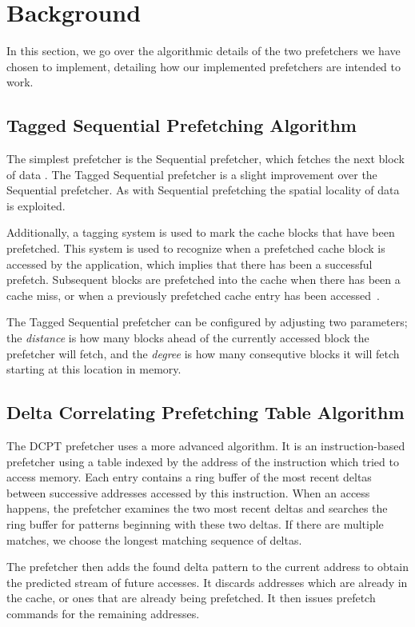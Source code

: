 \section{Background}

In this section, we go over the algorithmic details of the two prefetchers we
have chosen to implement, detailing how our implemented prefetchers are intended
to work.

\subsection{Tagged Sequential Prefetching Algorithm}

The simplest prefetcher is the Sequential prefetcher, which fetches the next
block of data \cite{seq}. The Tagged Sequential prefetcher is a slight
improvement over the Sequential prefetcher. As with Sequential prefetching the
spatial locality of data is exploited.

Additionally, a tagging system is used to mark the cache blocks that have been
prefetched. This system is used to recognize when a prefetched cache block is
accessed by the application, which implies that there has been a successful
prefetch. Subsequent blocks are prefetched into the cache when there has been a
cache miss, or when a previously prefetched cache entry has been
accessed~\cite{grannaes}.

The Tagged Sequential prefetcher can be configured by adjusting two parameters;
the \emph{distance} is how many blocks ahead of the currently accessed block the
prefetcher will fetch, and the \emph{degree} is how many consequtive blocks it
will fetch starting at this location in memory.

\subsection{Delta Correlating Prefetching Table Algorithm}

The DCPT prefetcher uses a more advanced algorithm. It is an instruction-based
prefetcher using a table indexed by the address of the instruction which tried
to access memory. Each entry contains a ring buffer of the most recent deltas
between successive addresses accessed by this instruction. When an access
happens, the prefetcher examines the two most recent deltas and searches the
ring buffer for patterns beginning with these two deltas. If there are multiple
matches, we choose the longest matching sequence of deltas.

The prefetcher then adds the found delta pattern to the current address to
obtain the predicted stream of future accesses. It discards addresses which
are already in the cache, or ones that are already being prefetched. It then
issues prefetch commands for the remaining addresses.

